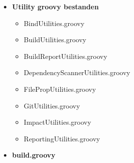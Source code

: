 \begin{multicols}{2}
\begin{itemize}
        \item \textbf{Utility groovy bestanden}
        \begin{itemize}
            \item BindUtilities.groovy
            \item BuildUtilities.groovy
            \item BuildReportUtilities.groovy
            \item DependencyScannerUtilities.groovy
            \item FilePropUtilities.groovy
            \item GitUtilities.groovy
            \item ImpactUtilities.groovy
            \item ReportingUtilities.groovy
        \end{itemize}
        
        \item \textbf{build.groovy}
    \end{itemize}
\end{multicols}
\\ \\
